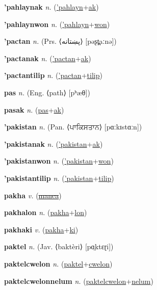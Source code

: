 \textbf{\hypertarget{'pahlaynak}{'pahlaynak}} \textit{n.} (\hyperlink{'pahlayn}{'pahlayn}+\allowbreak \hyperlink{ak}{ak})


\textbf{\hypertarget{'pahlaynwon}{'pahlaynwon}} \textit{n.} (\hyperlink{'pahlayn}{'pahlayn}+\allowbreak \hyperlink{won}{won})


\textbf{\hypertarget{'pactan}{'pactan}} \textit{n.} (Prs. ⟨{\arabics{}پښتانه‎‎}⟩ [pəʂt̪aːnə])


\textbf{\hypertarget{'pactanak}{'pactanak}} \textit{n.} (\hyperlink{'pactan}{'pactan}+\allowbreak \hyperlink{ak}{ak})


\textbf{\hypertarget{'pactantilip}{'pactantilip}} \textit{n.} (\hyperlink{'pactan}{'pactan}+\allowbreak \hyperlink{tilip}{tilip})


\textbf{\hypertarget{pas}{pas}} \textit{n.} (Eng. ⟨path⟩ [pʰæθ])


\textbf{\hypertarget{pasak}{pasak}} \textit{n.} (\hyperlink{pas}{pas}+\allowbreak \hyperlink{ak}{ak})


\textbf{\hypertarget{'pakistan}{'pakistan}} \textit{n.} (Pan. ⟨{\gurmukhi{}ਪਾਕਿਸਤਾਨ‎}⟩ [pɑːkɪstɑːn])


\textbf{\hypertarget{'pakistanak}{'pakistanak}} \textit{n.} (\hyperlink{'pakistan}{'pakistan}+\allowbreak \hyperlink{ak}{ak})


\textbf{\hypertarget{'pakistanwon}{'pakistanwon}} \textit{n.} (\hyperlink{'pakistan}{'pakistan}+\allowbreak \hyperlink{won}{won})


\textbf{\hypertarget{'pakistantilip}{'pakistantilip}} \textit{n.} (\hyperlink{'pakistan}{'pakistan}+\allowbreak \hyperlink{tilip}{tilip})


\textbf{\hypertarget{pakha}{pakha}} \textit{v.} (\hyperlink{manca}{\sout{manca}})


\textbf{\hypertarget{pakhalon}{pakhalon}} \textit{n.} (\hyperlink{pakha}{pakha}+\allowbreak \hyperlink{lon}{lon})


\textbf{\hypertarget{pakhaki}{pakhaki}} \textit{v.} (\hyperlink{pakha}{pakha}+\allowbreak \hyperlink{ki}{ki})


\textbf{\hypertarget{paktel}{paktel}} \textit{n.} (Jav. ⟨baktèri⟩ [pɑ̤ktɛɽi])


\textbf{\hypertarget{paktelcwelon}{paktelcwelon}} \textit{n.} (\hyperlink{paktel}{paktel}+\allowbreak \hyperlink{cwelon}{cwelon})


\textbf{\hypertarget{paktelcwelonnelum}{paktelcwelonnelum}} \textit{n.} (\hyperlink{paktelcwelon}{paktelcwelon}+\allowbreak \hyperlink{nelum}{nelum})


